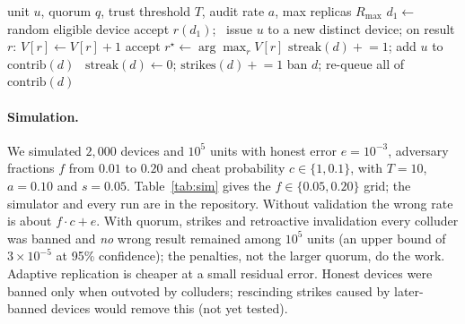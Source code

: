 \documentclass[11pt,a4paper]{article}
\theoremstyle{definition}
\theoremstyle{plain}
\begin{document}
\begin{algorithm}[ht]
\caption{Validator: quorum with strikes and retroactive invalidation (abbreviated)}\label{alg:validate}
\begin{algorithmic}[1]
\Require unit $u$, quorum $q$, trust threshold $T$, audit rate $a$, max replicas $R_{\max}$
\State $d_1\gets$ random eligible device
 accept $r(d_1)$; \Return \EndIf
\Repeat\ issue $u$ to a new distinct device; on result $r$: $V[r]\gets V[r]+1$
\State accept $r^\star\gets\arg\max_r V[r]$
   $\text{streak}(d)\mathrel{+}=1$; add $u$ to $\text{contrib}(d)$
  \Else\ $\text{streak}(d)\gets0$; $\text{strikes}(d)\mathrel{+}=1$
     ban $d$; re-queue all of $\text{contrib}(d)$ \EndIf
  \EndIf
\EndFor
\end{algorithmic}
\end{algorithm}

\paragraph{Simulation.} We simulated $2{,}000$ devices and $10^5$ units with honest error
$e=10^{-3}$, adversary fractions $f$ from $0.01$ to $0.20$ and cheat probability $c\in\{1,0.1\}$, with $T=10$,
$a=0.10$ and $s=0.05$. Table~\ref{tab:sim} gives the $f\in\{0.05,0.20\}$ grid; the simulator and every run are in the repository. Without validation the wrong rate is about $f\cdot c+e$. With quorum, strikes and retroactive invalidation
every colluder was banned and \emph{no} wrong result remained among $10^5$ units (an upper bound of
$3\times10^{-5}$ at 95\% confidence); the penalties, not the larger quorum, do the work. Adaptive replication is cheaper at a small residual error. Honest devices were banned only when outvoted by
colluders; rescinding strikes caused by later-banned devices would remove this (not yet tested).
\end{document}
